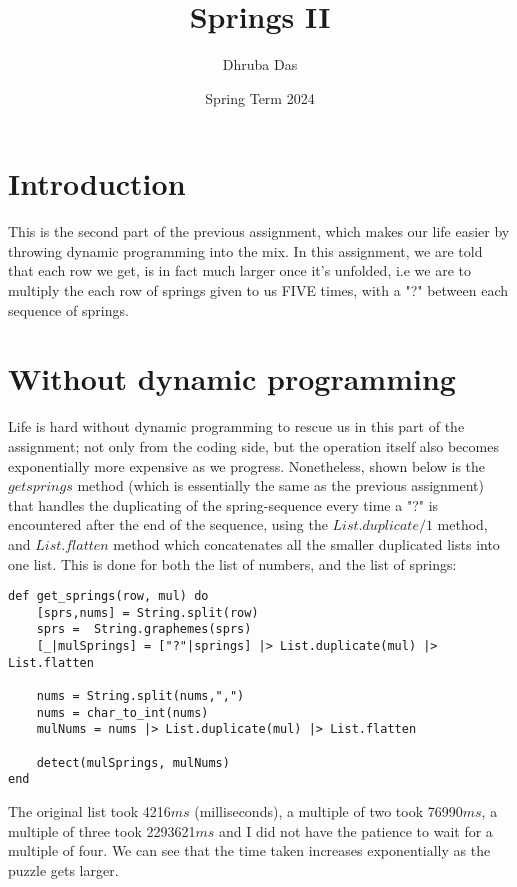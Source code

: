 \documentclass[a4paper,11pt]{article}
\begin{document}
\title{
    \textbf{Springs II}
}
\author{Dhruba Das}
\date{Spring Term 2024}

\maketitle

\section*{Introduction}
This is the second part of the previous assignment, which makes our life easier by throwing dynamic programming into the mix. In this assignment, we are told that each row we get, is in fact much larger once it's unfolded, i.e we are to multiply the each row of springs given to us FIVE times, with a "?" between each sequence of springs.

\section*{Without dynamic programming}
Life is hard without dynamic programming to rescue us in this part of the assignment; not only from the coding side, but the operation itself also becomes exponentially more expensive as we progress. Nonetheless, shown below is the $getsprings$ method (which is essentially the same as the previous assignment) that handles the duplicating of the spring-sequence every time a "?" is encountered after the end of the sequence, using the $List.duplicate/1$ method, and $List.flatten$ method which concatenates all the smaller duplicated lists into one list. This is done for both the list of numbers, and the list of springs:
\begin{verbatim}
def get_springs(row, mul) do
    [sprs,nums] = String.split(row)
    sprs =  String.graphemes(sprs)
    [_|mulSprings] = ["?"|springs] |> List.duplicate(mul) |> List.flatten

    nums = String.split(nums,",")
    nums = char_to_int(nums)
    mulNums = nums |> List.duplicate(mul) |> List.flatten

    detect(mulSprings, mulNums)
end
\end{verbatim}
The original list took 4216$ms$ (milliseconds), a multiple of two took 76990$ms$, a multiple of three took 2293621$ms$ and I did not have the patience to wait for a multiple of four. We can see that the time taken increases exponentially as the puzzle gets larger.
\end{document}
